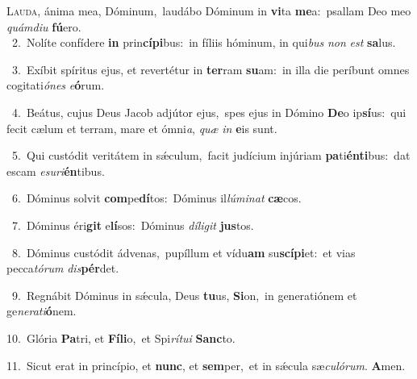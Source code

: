 \lettrine{\initial\textcolor{\initialcolor}{L}}{auda,} ánima mea, Dóminum,~\dagger laudábo Dóminum in \textbf{vi}\-ta \textbf{me}\-a:~\star psallam Deo meo \textit{quám}\-\textit{di}\textit{u} \textbf{fú}\-ero.\\
{\numbfont\textcolor{\numbcolor}{~2.}}~Nolíte confídere \textbf{in} prin\-\textbf{cí}\-\textbf{pi}bus:~\star in fíliis hóminum, in qui\textit{bus} \textit{non} \textit{est} \textbf{sa}\-lus.\par
{\numbfont\textcolor{\numbcolor}{~3.}}~Exíbit spíritus ejus, et revertétur in \textbf{ter}\-ram \textbf{su}\-am:~\star in illa die períbunt omnes cogitati\-\textit{ó}\-\textit{nes} \textit{e}\-\textbf{ó}rum.\par
{\numbfont\textcolor{\numbcolor}{~4.}}~Beátus, cujus Deus Jacob adjútor ejus,~\dagger spes ejus in Dómino \textbf{De}\-o ip\-\textbf{sí}\-us:~\star qui fecit cælum et terram, mare et ómni\-\textit{a}\-, \textit{quæ} \textit{in} \textbf{e}\-is sunt.\par
{\numbfont\textcolor{\numbcolor}{~5.}}~Qui custódit veritátem in sǽculum,~\dagger facit judícium injúriam \textbf{pa}\-ti\-\textbf{én}\-\textbf{ti}bus:~\star dat escam \textit{e}\-\textit{su}\textit{ri}\textbf{én}tibus.\par
{\numbfont\textcolor{\numbcolor}{~6.}}~Dóminus solvit \textbf{com}\-pe\-\textbf{dí}\-tos:~\star Dóminus il\-\textit{lú}\-\textit{mi}\textit{nat} \textbf{cæ}\-cos.\par
{\numbfont\textcolor{\numbcolor}{~7.}}~Dóminus éri\textbf{git} e\-\textbf{lí}\-sos:~\star Dóminus \textit{dí}\-\textit{li}\textit{git} \textbf{jus}\-tos.\par
{\numbfont\textcolor{\numbcolor}{~8.}}~Dóminus custódit ádvenas,~\dagger pupíllum et vídu\textbf{am} su\-\textbf{scí}\-\textbf{pi}et:~\star et vias pecca\-\textit{tó}\-\textit{rum} \textit{dis}\-\textbf{pér}det.\par
{\numbfont\textcolor{\numbcolor}{~9.}}~Regnábit Dóminus in sǽcula, Deus \textbf{tu}\-us, \textbf{Si}\-on,~\star in generatiónem et ge\-\textit{ne}\-\textit{ra}\textit{ti}\textbf{ó}nem.\par
{\numbfont\textcolor{\numbcolor}{10.}}~Glória \textbf{Pa}\-tri, et \textbf{Fí}\-\textbf{li}o,~\star et Spi\-\textit{rí}\-\textit{tu}\textit{i} \textbf{Sanc}\-to.\par
{\numbfont\textcolor{\numbcolor}{11.}}~Sicut erat in princípio, et \textbf{nunc}\-, et \textbf{sem}\-per,~\star et in sǽcula sæ\-\textit{cu}\-\textit{ló}\textit{rum}. \textbf{A}\-men.\par
